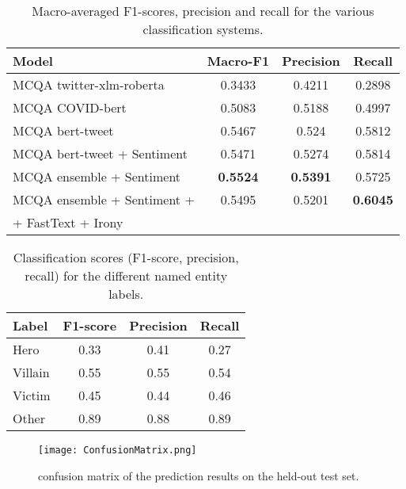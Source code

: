 \documentclass[11pt]{article}
\begin{document}
\begin{table*}[h!]
\centering
\begin{tabular}{|l|c|c|c|}
\hline
\textbf{Model }                                      & \textbf{Macro-F1} & \textbf{Precision} & \textbf{Recall} \\ \hline
MCQA twitter-xlm-roberta                     &   0.3433       &   0.4211      & 0.2898          \\ \hline
MCQA COVID-bert                              &  0.5083        &  0.5188       &  0.4997         \\ \hline
MCQA bert-tweet                             & 0.5467         &  0.524       &  0.5812                  \\ \hline
MCQA bert-tweet + Sentiment                  & 0.5471         &  0.5274       & 0.5814\\ \hline
MCQA ensemble + Sentiment                    & \textbf{0.5524}         & \textbf{0.5391}        & 0.5725  \\ \hline
MCQA ensemble + Sentiment +  & 0.5495     & 0.5201  & \textbf{0.6045}  \\ 
 + FastText + Irony &          &         &            \\ \hline
\end{tabular}
\caption{Macro-averaged F1-scores, precision and recall for the various classification systems.}\label{Scores}
\end{table*}

\begin{table}[h!]
\centering
\begin{tabular}{|l|c|c|c|}
\hline
\textbf{Label}  & \textbf{F1-score} & \textbf{Precision} & \textbf{Recall} \\
\hline
Hero & 0.33 & 0.41 & 0.27\\
Villain & 0.55 & 0.55 & 0.54\\
Victim & 0.45 & 0.44 & 0.46 \\
Other & 0.89 & 0.88 & 0.89 \\
\hline
\end{tabular}
\caption{Classification scores (F1-score, precision, recall) for the different named entity labels.}\label{labels}
\end{table}

\begin{figure}[h]
    \texttt{[image: ConfusionMatrix.png]}
    \caption{confusion matrix of the prediction results on the held-out test set.}
    \label{confusion}
\end{figure}
\end{document}
